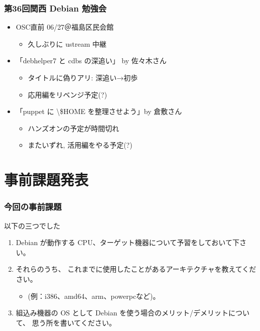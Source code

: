 \documentclass[cjk,dvipdfmx,12pt,%
hyperref={bookmarks=true,bookmarksnumbered=true,bookmarksopen=false,%
colorlinks=false,%
pdftitle={第38回関西Debian勉強会},%
pdfauthor={倉敷・のがた・佐々木},%
pdfsubject={資料},%
}]{beamer}
\begin{document}
\begin{frame}[fragile]
\frametitle{第36回関西 Debian 勉強会}


\begin{itemize}
\item OSC直前 06/27＠福島区民会館

\begin{itemize}
\item 久しぶりに ustream 中継
\end{itemize}

\item 「debhelper7 と cdbs の深追い」 by 佐々木さん

\begin{itemize}
\item タイトルに偽りアリ: 深追い→初歩
\item 応用編をリベンジ予定(?)
\end{itemize}

\item 「puppet に \textbackslash{}\$HOME を整理させよう」by 倉敷さん

\begin{itemize}
\item ハンズオンの予定が時間切れ
\item またいずれ, 活用編をやる予定(?)
\end{itemize}
\end{itemize}


\end{frame}





\section{事前課題発表}


\begin{frame}[fragile]
\frametitle{今回の事前課題}


\begin{block}{以下の三つでした}
    \begin{enumerate}
          \item
        Debian が動作する CPU、ターゲット機器について予習をしておいて下さい。
          \item
        それらのうち、
        これまでに使用したことがあるアーキテクチャを教えてください。
        \begin{itemize}
        \item (例：i386、amd64、arm、powerpcなど)。
        \end{itemize}
          \item
        組込み機器の OS として
        Debian を使う場合のメリット/デメリットについて、
        思う所を書いてください。
    \end{enumerate}
\end{block}


\end{frame}
\end{document}
